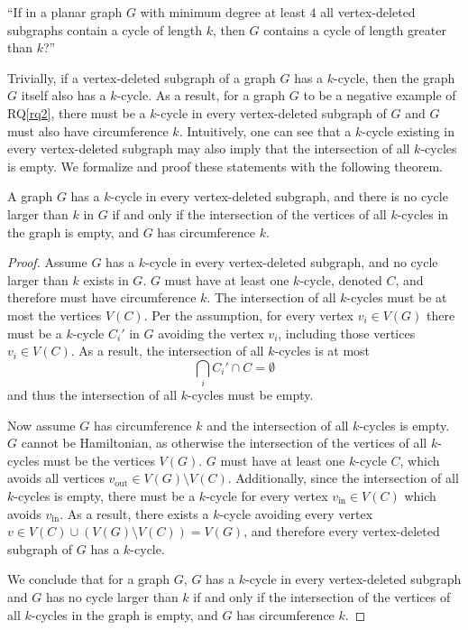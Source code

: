 \begin{samepage}
``If in a planar graph $G$ with minimum degree at least $4$ all vertex-deleted subgraphs contain a cycle of length $k$, then $G$ contains a cycle of length greater than $k$?''
\end{samepage}

Trivially, if a vertex-deleted subgraph of a graph $G$ has a $k$-cycle, then the graph $G$ itself also has a $k$-cycle. As a result, for a graph $G$ to be a negative example of RQ\ref{rq2}, there must be a $k$-cycle in every vertex-deleted subgraph of $G$ and $G$ must also have circumference $k$. Intuitively, one can see that a $k$-cycle existing in every vertex-deleted subgraph may also imply that the intersection of all $k$-cycles is empty. We formalize and proof these statements with the following theorem.

\begin{theorem}
  \label{theorem:intersection-vertex-deletion}
  A graph $G$ has a $k$-cycle in every vertex-deleted subgraph, and there is no cycle larger than $k$ in $G$ if and only if the intersection of the vertices of all $k$-cycles in the graph is empty, and $G$ has circumference $k$.
\end{theorem}

\begin{proof}
  Assume $G$ has a $k$-cycle in every vertex-deleted subgraph, and no cycle larger than $k$ exists in $G$. $G$ must have at least one $k$-cycle, denoted $C$, and therefore must have circumference $k$. The intersection of all $k$-cycles must be at most the vertices $V(C)$. Per the assumption, for every vertex $v_i \in V(G)$ there must be a $k$-cycle $C_i'$ in $G$ avoiding the vertex $v_i$, including those vertices $v_i \in V(C)$. As a result, the intersection of all $k$-cycles is at most
  $$
  \bigcap_{i} C_i' \cap C = \emptyset
  $$
  and thus the intersection of all $k$-cycles must be empty.

  Now assume $G$ has circumference $k$ and the intersection of all $k$-cycles is empty. $G$ cannot be Hamiltonian, as otherwise the intersection of the vertices of all $k$-cycles must be the vertices $V(G)$. $G$ must have at least one $k$-cycle $C$, which avoids all vertices $v_{\text{out}} \in V(G) \setminus V(C)$. Additionally, since the intersection of all $k$-cycles is empty, there must be a $k$-cycle for every vertex $v_{\text{in}} \in V(C)$ which avoids $v_{\text{in}}$. As a result, there exists a $k$-cycle avoiding every vertex $v \in V(C) \cup (V(G) \setminus V(C)) = V(G)$, and therefore every vertex-deleted subgraph of $G$ has a $k$-cycle.

  We conclude that for a graph $G$, $G$ has a $k$-cycle in every vertex-deleted subgraph and $G$ has no cycle larger than $k$ if and only if the intersection of the vertices of all $k$-cycles in the graph is empty, and $G$ has circumference $k$.
\end{proof}

